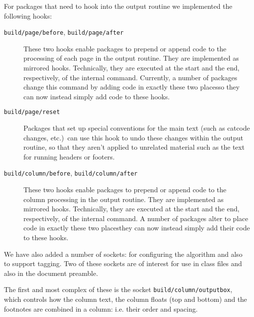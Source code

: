\documentclass{ltnews}
\providecommand\Dash {\unskip \textemdash}
\providecommand\hook[1]{\texttt{#1}}
\providecommand\socket[1]{\texttt{#1}}
\begin{document}
For packages that need to hook into the output routine we implemented the following hooks:
\begin{description}

\item[\hook{build/page/before}, \hook{build/page/after}]
   These two hooks enable packages to prepend or append code to
   the processing of each page in the output routine. They are
   implemented as mirrored hooks.
   Technically, they are executed at the start and the end, respectively, of the
   internal \LaTeXe{}  command.  Currently, a number of packages change this command by adding code in exactly
   these two places\Dash so they can now instead simply add code to these
   hooks. 

 \item[\hook{build/page/reset}]
   Packages that set up special conventions for the main text 
   (such as catcode changes, etc.)\ can use this hook to
   undo these changes within the output routine, so that they
   aren't applied to unrelated material such as the text for
   running headers or footers.

\item[\hook{build/column/before}, \hook{build/column/after}]
   These two hooks enable packages to prepend or append code to
   the column processing in the output routine. They are
   implemented as mirrored hooks.
   Technically, they are executed at the start and the end, respectively, of the
   internal \LaTeXe{}  command.  A
   number of packages alter  to place code in exactly
   these two places\Dash they can now instead simply add their code to these
   hooks. 
\end{description}

We have also added a number of sockets: for configuring the algorithm and also to
support tagging. 
Two of these sockets are of interest for use in
class files and also in the document preamble. 

The first and most complex of these is the socket \socket{build/column/outputbox}, 
which controls how the
column text, the column floats (top and bottom) and the footnotes are
combined in a column: i.e. their order and spacing. 
\end{document}
